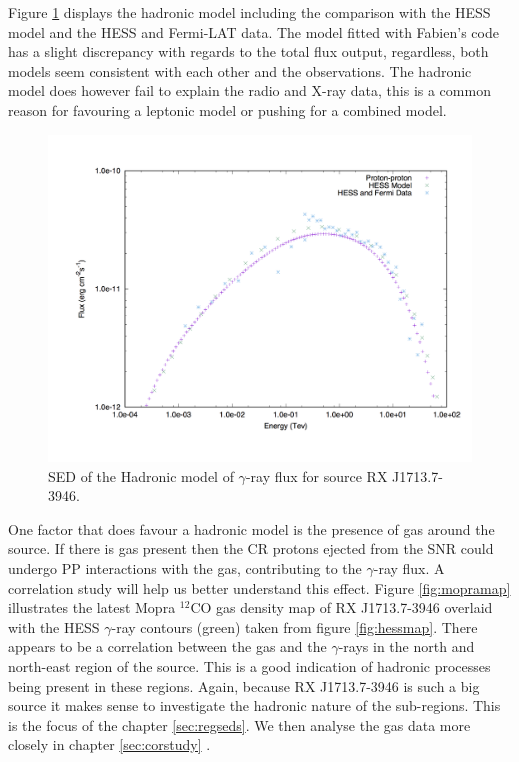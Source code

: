 \documentclass[12pt,a4paper]{article}
\begin{document}
Figure \ref{fig:rxj1713had} displays the hadronic model including the comparison with the HESS model and the HESS and Fermi-LAT data. The model fitted with Fabien's code has a slight discrepancy with regards to the total flux output, regardless, both models seem consistent with each other and the observations. The hadronic model does however fail to explain the radio and X-ray data, this is a common reason for favouring a leptonic model or pushing for a combined model. 
\begin{figure}[H]
	\centering
	\includegraphics[width=0.45\linewidth, height=0.35\textheight, angle=-90]{rxj1713_had}
	\caption{SED of the Hadronic model of $\gamma$-ray flux for source RX J1713.7-3946.}
	\label{fig:rxj1713had}
\end{figure}
One factor that does favour a hadronic model is the presence of gas around the source. If there is gas present then the CR protons ejected from the SNR could undergo PP interactions with the gas, contributing to the $\gamma$-ray flux. A correlation study will help us better understand this effect. Figure \ref{fig:mopramap} illustrates the latest Mopra $^{12}$CO gas density map of RX J1713.7-3946 overlaid with the HESS $\gamma$-ray contours (green) taken from figure \ref{fig:hessmap}. There appears to be a correlation between the gas and the $\gamma$-rays in the north and north-east region of the source. This is a good indication of hadronic processes being present in these regions. Again, because RX J1713.7-3946 is such a big source it makes sense to investigate the hadronic nature of the sub-regions. This is the focus of the chapter \ref{sec:regseds}. We then analyse the gas data more closely in chapter \ref{sec:corstudy} .
\end{document}
